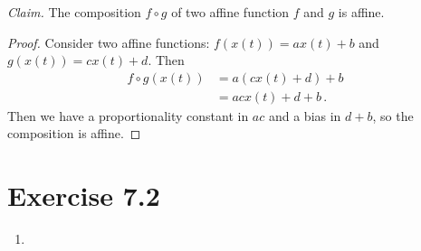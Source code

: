 \documentclass{abrice}
\begin{document}
\textit{Claim.} The composition $f \circ g$ of two affine function $f$ and $g$
is affine.

\begin{proof}
  Consider two affine functions: $f(x(t)) = ax(t) + b$ and
  $g(x(t)) = cx(t) + d$. Then
  \begin{align*}
    f \circ g (x(t))
    &= a(cx(t) + d) + b \\
    &= acx(t) + d + b\, .
  \end{align*}
  Then we have a proportionality constant in $ac$ and a bias in $d + b$, so the
  composition is affine.
\end{proof}

\section{Exercise 7.2}

\begin{enumerate}[label= (\alph*)]
\item
\end{enumerate}
\end{document}
